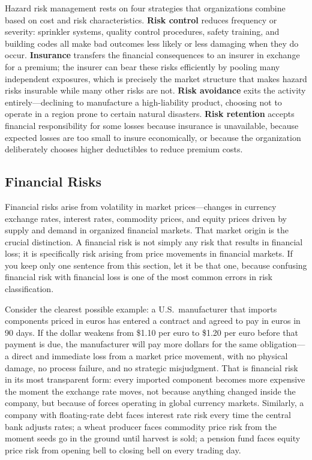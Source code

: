 \documentclass[11pt,openany]{book}
\begin{document}
Hazard risk management rests on four strategies that organizations combine based on cost and risk characteristics. \textbf{Risk control} reduces frequency or severity: sprinkler systems, quality control procedures, safety training, and building codes all make bad outcomes less likely or less damaging when they do occur. \textbf{Insurance} transfers the financial consequences to an insurer in exchange for a premium; the insurer can bear these risks efficiently by pooling many independent exposures, which is precisely the market structure that makes hazard risks insurable while many other risks are not. \textbf{Risk avoidance} exits the activity entirely---declining to manufacture a high-liability product, choosing not to operate in a region prone to certain natural disasters. \textbf{Risk retention} accepts financial responsibility for some losses because insurance is unavailable, because expected losses are too small to insure economically, or because the organization deliberately chooses higher deductibles to reduce premium costs.

\subsection{Financial Risks}
\label{subsec:financial-risks}

Financial risks arise from volatility in market prices---changes in currency exchange rates, interest rates, commodity prices, and equity prices driven by supply and demand in organized financial markets. That market origin is the crucial distinction. A financial risk is not simply any risk that results in financial loss; it is specifically risk arising from price movements in financial markets. If you keep only one sentence from this section, let it be that one, because confusing financial risk with financial loss is one of the most common errors in risk classification.

Consider the clearest possible example: a U.S.\ manufacturer that imports components priced in euros has entered a contract and agreed to pay in euros in 90 days. If the dollar weakens from \$1.10 per euro to \$1.20 per euro before that payment is due, the manufacturer will pay more dollars for the same obligation---a direct and immediate loss from a market price movement, with no physical damage, no process failure, and no strategic misjudgment. That is financial risk in its most transparent form: every imported component becomes more expensive the moment the exchange rate moves, not because anything changed inside the company, but because of forces operating in global currency markets. Similarly, a company with floating-rate debt faces interest rate risk every time the central bank adjusts rates; a wheat producer faces commodity price risk from the moment seeds go in the ground until harvest is sold; a pension fund faces equity price risk from opening bell to closing bell on every trading day.
\end{document}
